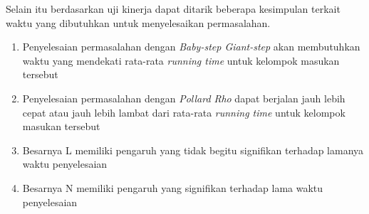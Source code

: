 Selain itu berdasarkan uji kinerja dapat ditarik beberapa kesimpulan terkait waktu yang dibutuhkan untuk menyelesaikan permasalahan.

\begin{enumerate}
	\item Penyelesaian permasalahan dengan \textit{Baby-step Giant-step} akan membutuhkan waktu yang mendekati rata-rata \textit{running time} untuk kelompok masukan tersebut
	\item Penyelesaian permasalahan dengan \textit{Pollard Rho} dapat berjalan jauh lebih cepat atau jauh lebih lambat dari rata-rata \textit{running time} untuk kelompok masukan tersebut
	\item Besarnya L memiliki pengaruh yang tidak begitu signifikan terhadap lamanya waktu penyelesaian
	\item Besarnya N memiliki pengaruh yang signifikan terhadap lama waktu penyelesaian
\end{enumerate}
